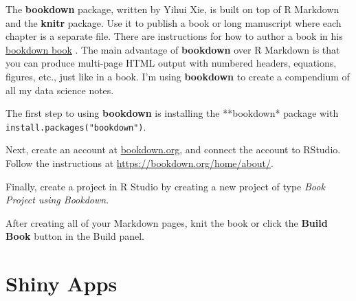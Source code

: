 \documentclass[]{book}
\begin{document}
The \textbf{bookdown} package, written by Yihui Xie, is built on top of R Markdown and the \textbf{knitr} package. Use it to publish a book or long manuscript where each chapter is a separate file. There are instructions for how to author a book in his \href{https://bookdown.org/yihui/bookdown/}{bookdown book} \citep{xie2019}. The main advantage of \textbf{bookdown} over R Markdown is that you can produce multi-page HTML output with numbered headers, equations, figures, etc., just like in a book. I'm using \textbf{bookdown} to create a compendium of all my data science notes.

The first step to using \textbf{bookdown} is installing the **bookdown* package with \texttt{install.packages("bookdown")}.

Next, create an account at \href{http://bookdown.org}{bookdown.org}, and connect the account to RStudio. Follow the instructions at \url{https://bookdown.org/home/about/}.

Finally, create a project in R Studio by creating a new project of type \emph{Book Project using Bookdown}.

After creating all of your Markdown pages, knit the book or click the \textbf{Build Book} button in the Build panel.

\hypertarget{shiny-apps}{%
\chapter*{Shiny Apps}\label{shiny-apps}}


\end{document}
